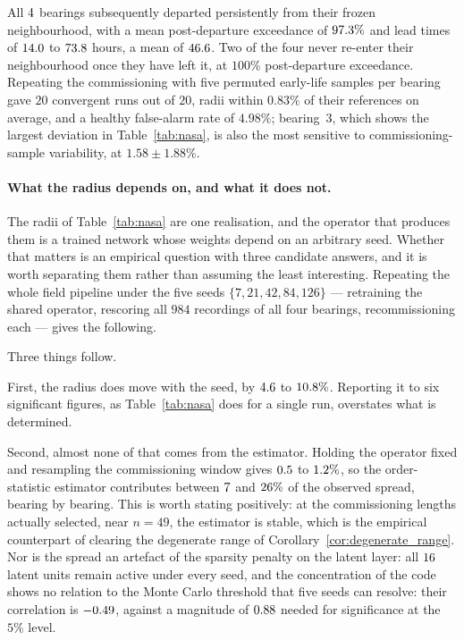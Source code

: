 \documentclass[a4paper]{cas-sc}
\begin{document}
All \(4\) bearings subsequently departed persistently from their
frozen neighbourhood, with a mean post-departure exceedance of
\(97.3\%\) and lead times of \(14.0\) to
\(73.8\) hours, a mean of \(46.6\). Two of the four never
re-enter their neighbourhood once they have left it, at \(100\%\)
post-departure exceedance. %
Repeating the
commissioning with five permuted early-life samples per bearing gave \(20\)
convergent runs out of \(20\), radii within \(0.83\%\) of their references on
average, and a healthy false-alarm rate of \(4.98\%\); bearing~3, which shows
the largest deviation in Table~\ref{tab:nasa}, is also the most sensitive to
commissioning-sample variability, at \(1.58\pm1.88\%\).

\paragraph{What the radius depends on, and what it does not.}
The radii of Table~\ref{tab:nasa} are one realisation, and the operator that
produces them is a trained network whose weights depend on an arbitrary seed.
Whether that matters is an empirical question with three candidate answers,
and it is worth separating them rather than assuming the least interesting.
Repeating the whole field pipeline under the five seeds
\(\{7,21,42,84,126\}\) --- retraining the shared operator, rescoring all
\(984\) recordings of all four bearings, recommissioning each --- gives the
following.



Three things follow.

First, the radius does move with the seed, by \(4.6\) to \(10.8\%\). Reporting
it to six significant figures, as Table~\ref{tab:nasa} does for a single run,
overstates what is determined.

Second, almost none of that comes from the estimator. Holding the operator
fixed and resampling the commissioning window gives \(0.5\) to \(1.2\%\), so
the order-statistic estimator contributes between \(7\) and \(26\%\) of the
observed spread, bearing by bearing. This is worth stating positively: at the commissioning
lengths actually selected, near \(n=49\), the estimator is stable, which is
the empirical counterpart of clearing the degenerate range of
Corollary~\ref{cor:degenerate_range}. Nor is the spread an artefact of the
sparsity penalty on the latent layer: all \(16\) latent units remain active
under every seed, and the concentration of the code shows no relation to the
Monte Carlo threshold that five seeds can resolve: their correlation is
\(-0.49\), against a magnitude of \(0.88\) needed for
significance at the \(5\%\) level.
\end{document}
